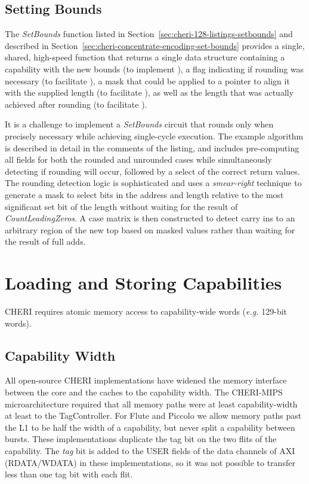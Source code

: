 \subsection{Setting Bounds}
The \emph{SetBounds} function listed in Section~\ref{sec:cheri-128-listings-setbounds} and described in Section~\ref{sec:cheri-concentrate-encoding-set-bounds} provides a single, shared, high-speed function that returns a single data structure containing a capability with the new bounds (to implement ),
a flag indicating if rounding was necessary (to facilitate ),
a mask that could be applied to a pointer to align it with the supplied length (to facilitate ),
as well as the length that was actually achieved after rounding (to facilitate ).

It is a challenge to implement a \emph{SetBounds} circuit that rounds only when precisely necessary while achieving single-cycle execution.
The example algorithm is described in detail in the comments of the listing, and includes pre-computing all fields for both the rounded and unrounded cases while simultaneously detecting if rounding will occur, followed by a select of the correct return values.
The rounding detection logic is sophisticated and uses a \emph{smear-right} technique to generate a mask to select bits in the address and length relative to the most significant set bit of the length without waiting for the result of \emph{CountLeadingZeros}.
A case matrix is then constructed to detect carry ins to an arbitrary region of the new top based on masked values rather than waiting for the result of full adds.

\section{Loading and Storing Capabilities}
CHERI requires atomic memory access to capability-wide words (\textit{e.g.} 129-bit words).

\subsection{Capability Width}
All open-source CHERI implementations have widened the memory interface between the core and the caches to the capability width.
The CHERI-MIPS microarchitecture required that all memory paths were at least capability-width at least to the TagController.
For Flute and Piccolo we allow memory paths past the L1 to be half the width of a capability, but never split a capability between bursts.
These implementations duplicate the tag bit on the two flits of the capability.
The \emph{tag} bit is added to the USER fields of the data channels of AXI (RDATA/WDATA) in these implementations, so it was not possible to transfer less than one tag bit with each flit.

